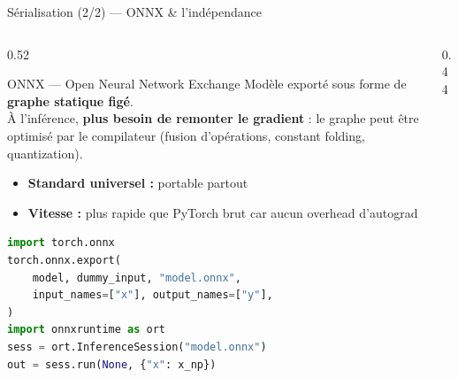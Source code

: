 \documentclass[aspectratio=169, 10pt]{beamer}
\begin{document}
\begin{frame}[fragile]{Sérialisation (2/2) --- ONNX \& l'indépendance}
  \begin{columns}[T]
    \begin{column}{0.52\textwidth}
      \begin{exampleblock}{ONNX --- Open Neural Network Exchange}
        Modèle exporté sous forme de \textbf{graphe statique figé}.\\[4pt]
        À l'inférence, \textbf{plus besoin de remonter le gradient} :
        le graphe peut être optimisé par le compilateur
        (fusion d'opérations, constant folding, quantization).
        \begin{itemize}
          \item \textbf{Standard universel :} portable partout
          \item \textbf{Vitesse :} plus rapide que PyTorch brut car
                aucun overhead d'autograd
        \end{itemize}
      \end{exampleblock}
\begin{lstlisting}[language=Python, basicstyle=\ttfamily\scriptsize]
import torch.onnx
torch.onnx.export(
    model, dummy_input, "model.onnx",
    input_names=["x"], output_names=["y"],
)
import onnxruntime as ort
sess = ort.InferenceSession("model.onnx")
out = sess.run(None, {"x": x_np})
\end{lstlisting}
    \end{column}
    \begin{column}{0.44\textwidth}
      \begin{center}
      \end{center}

\end{column}
\end{columns}
\end{frame}
\end{document}
